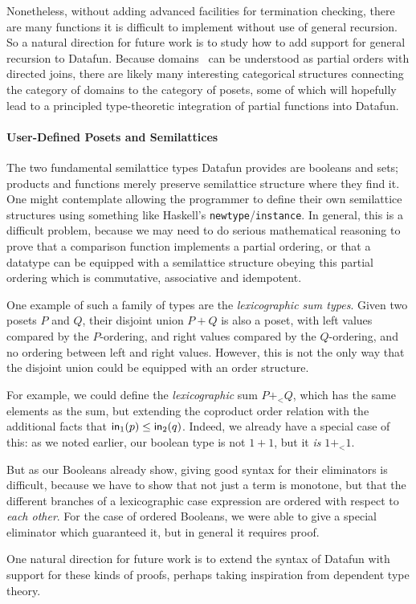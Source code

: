 Nonetheless, without adding advanced facilities for termination
checking, there are many functions it is difficult to implement
without use of general recursion. So a natural direction for future
work is to study how to add support for general recursion to Datafun.
Because domains~\citep{domain-theory} can be understood as partial
orders with directed joins, there are likely many interesting
categorical structures connecting the category of domains to the
category of posets, some of which will hopefully lead to a principled
type-theoretic integration of partial functions into Datafun.

\paragraph{User-Defined Posets and Semilattices}
The two fundamental semilattice types Datafun provides are booleans and sets;
products and functions merely preserve semilattice structure where they find it.
One might contemplate allowing the programmer to define their own semilattice
structures using something like Haskell's \texttt{newtype}/\texttt{instance}. In
general, this is a difficult problem, because we may need to do serious
mathematical reasoning to prove that a comparison function implements a partial
ordering, or that a datatype can be equipped with a semilattice structure
obeying this partial ordering which is commutative, associative and idempotent.

One example of such a family of types are the \emph{lexicographic sum
  types}. Given two posets $P$ and $Q$, their disjoint union $P + Q$
is also a poset, with left values compared by the $P$-ordering, and
right values compared by the $Q$-ordering, and no ordering between
left and right values. However, this is not the only way that the
disjoint union could be equipped with an order structure.

For example, we could define the \emph{lexicographic} sum $P +_< Q$,
which has the same elements as the sum, but extending the coproduct order
relation with the additional facts that $\text{\sffamily in}_1(p) \leq \text{\sffamily in}_2(q)$.
Indeed, we already have a special case of this: as we noted earlier, our boolean
type is not $1 + 1$, but it \emph{is} $1 +_< 1$.

But as our Booleans already show, giving good syntax for their
eliminators is difficult, because we have to show that not just a term
is monotone, but that the different branches of a lexicographic case
expression are ordered with respect to \emph{each other}. For the case
of ordered Booleans, we were able to give a special eliminator which
guaranteed it, but in general it requires proof.

One natural direction for future work is to extend the syntax of
Datafun with support for these kinds of proofs, perhaps taking
inspiration from dependent type theory.
